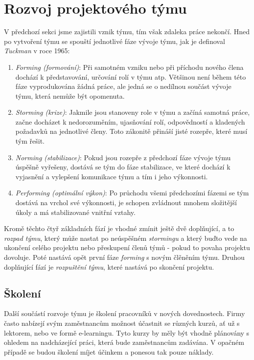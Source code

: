 
\section{Rozvoj projektového týmu}

V předchozí sekci jsme zajistili vznik týmu, tím však zdaleka práce nekončí. Hned po vytvoření týmu se spouští jednotlivé fáze vývoje týmu, jak je definoval \emph{Tuckman} \cite{tuckman} v roce 1965:
\begin{enumerate}
	\item \emph{Forming (formování)}: Při samotném vzniku nebo při příchodu nového člena dochází k představování, určování rolí v týmu atp. Většinou není během této fáze vyprodukována žádná práce, ale jedná se o nedílnou součást vývoje týmu, která nemůže být opomenuta.
	\item \emph{Storming (krize)}: Jakmile jsou stanoveny role v týmu a začíná samotná práce, začne docházet k nedorozuměním, ujasňování rolí, odpovědností a kladených požadavků na jednotlivé členy. Toto zákonitě přináší jisté rozepře, které musí tým řešit.
	\item \emph{Norming (stabilizace)}: Pokud jsou rozepře z předchozí fáze vývoje týmu úspěšně vyřešeny, dostává se tým do fáze stabilizace, ve které dochází k vyjasnění a vylepšení komunikace týmu a tím i jeho výkonnosti.
	\item \emph{Performing (optimální výkon)}: Po průchodu všemi předchozími fázemi se tým dostává na vrchol své výkonnosti, je schopen zvládnout mnohem složitější úkoly a má stabilizované vnitřní vztahy.
\end{enumerate}
Kromě těchto čtyř základních fází je vhodné zmínit ještě dvě doplňující, a to \emph{rozpad týmu}, který může nastat po neúspěšném \emph{stormingu} a který buďto vede na ukončení celého projektu nebo přeskupení členů týmů - pokud to povaha projektu dovoluje. Poté nastává opět první fáze \emph{forming} s novým člěněním týmu. Druhou doplňující fází je \emph{rozpuštění týmu}, které nastává po skončení projektu.

\subsection{Školení}
Další součástí rozvoje týmu je školení pracovníků v nových dovednostech. Firmy často nabízejí svým zaměstnancům možnost účastnit se různých kurzů, ať už s lektorem, nebo ve formě e-learningu. Tyto kurzy by měly být vhodně plánovány s ohledem na nadcházející práci, která bude zaměstnancům zadávána. V opačném případě se budou školení míjet účinkem a ponesou tak pouze náklady.

